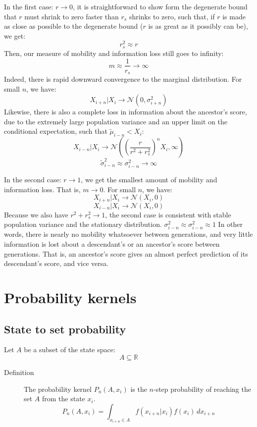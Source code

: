 \documentclass[letterpaper,10pt]{article} %
\begin{document}
In the first case: $r \rightarrow 0$, it is straightforward to show form the degenerate bound that $r$ must shrink to zero faster than $r_s$ shrinks to zero, such that, if $r$ is made as close as possible to the degenerate bound ($r$ is as great as it possibly can be), we get:
$$r_s^2 \approx r$$
Then, our measure of mobility and information loss still goes to infinity:
$$m \approx \frac{1}{r_s} \rightarrow \infty$$
Indeed, there is rapid downward convergence to the marginal distribution. For small $n$, we have:
$$X_{i+n}|X_i \rightarrow \mathcal{N}(0, \sigma_{i+n}^2)$$
Likewise, there is also a complete loss in information about the ancestor's score, due to the extremely large population variance and an upper limit on the conditional expectation, such that $\tilde{\mu}_{i-n} < X_i$:
$$X_{i-n}|X_i \rightarrow \mathcal{N}((\frac{r}{r^2+r_s^2})^n X_i, \infty)$$
$$\tilde{\sigma}_{i-n}^2 \approx \sigma_{i-n}^2 \rightarrow \infty$$


In the second case: $r \rightarrow 1$, we get the smallest amount of mobility and information loss. That is, $m \rightarrow 0$. For small $n$, we have:
$$X_{i+n}|X_i \rightarrow \mathcal{N}(X_i, 0)$$
$$X_{i-n}|X_i \rightarrow \mathcal{N}(X_i, 0)$$
Because we also have $r^2 + r_s^2 \rightarrow 1$, the second case is consistent with stable population variance and the stationary distribution.
$\sigma_{i-n}^2 \approx \sigma_{i-n}^2 \approx 1$
In other words, there is nearly no mobility whatsoever between generations, and very little information is lost about a descendant's or an ancestor's score between generations. That is, an ancestor's score gives an almost perfect prediction of its descendant's score, and vice versa.




\section{Probability kernels}

\subsection{State to set probability}
Let $A$ be a subset of the state space: 
%
$$A \subseteq \mathbb{R}$$

\begin{description}
\item [Definition] The probability kernel $P_n(A, x_i)$ is the $n$-step probability of reaching the set $A$ from the state $x_i$.
$$P_n(A, x_i) = \int_{x_{i+n}\in A}^{} f(x_{i+n}|x_i)f(x_i) \, dx_{i+n}$$
\end{description}
\end{document}
